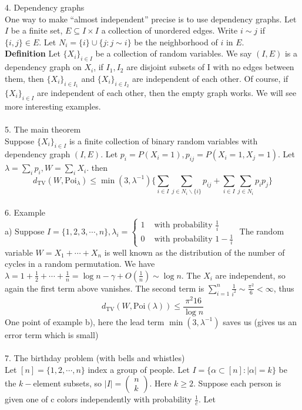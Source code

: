 \documentclass[12pt]{article}
\begin{document}
4. Dependency graphs\\
One way to make ``almost independent'' precise is to use dependency graphs. Let $I$ be a finite set, $E \subseteq I \times I$ a collection of unordered edges. Write $i \sim j$ if $\{i, j\}\in E$. Let $N_i = \{i\} \cup \{j: j\sim i\}$ be the neighborhood of $i$ in $E$.\\
\textbf{Definition} Let $\{X_i\}_{i \in I}$ be a collection of random variables. We say $(I, E)$ is a dependency graph on $X_i$, if $I_1, I_2$ are disjoint subsets of I with no edges between them, then $\{X_i\}_{i \in I_1}$ and $\{X_i\}_{i \in I_2}$ are independent of each other. Of course, if $\{X_i\}_{i \in I}$ are independent of each other, then the empty graph works. We will see more interesting examples.\\
\\
5. The main theorem\\
Suppose $\{X_i\}_{i \in I}$ is a finite collection of binary random variables with dependency graph $(I, E)$. Let $p_i = P(X_i = 1), p_{ij} = P(X_i = 1, X_j = 1)$. Let $\lambda = \sum_i p_i, W = \sum_i X_i$. then
$$d_{\text{TV}}(W, \text{Poi}_{\lambda}) \leqslant \min(3, \lambda^{-1})\{\sum_{i \in I}\sum_{j \in N_i\backslash \{i\}}p_{ij} + \sum_{i \in I}\sum_{j\in N_i}p_ip_j\}$$
\\
6. Example\\
a) Suppose $I = \{1, 2, 3, \cdots, n\}, \lambda_i = \begin{cases}
	1 & \text{ with probability }\frac{1}{i}\\
	0 & \text{ with probability }1 - \frac{1}{i}
\end{cases}$
The random variable $W = X_1 + \cdots + X_n$ is well known as the distribution of the number of cycles in a random permutation. We have $\lambda = 1 + \frac{1}{2} + \cdots + \frac{1}{n} = \log n - \gamma + O(\frac{1}{n}) \sim \log n$. The $X_i$ are independent, so again the first term above vanishes. The second term is $\sum_{i = 1}^n \frac{1}{i^2} \sim \frac{\pi^2}{6} < \infty$, thus
$$d_{\text{TV}}(W, \text{Poi}(\lambda)) \leqslant \frac{\pi^2 16}{\log n}$$
One point of example b), here the lead term $\min(3, \lambda^{-1})$ saves us (gives us an error term which is small)\\
\\
7. The birthday problem (with bells and whistles)\\
Let $[n] = \{1, 2, \cdots, n\}$ index a group of people. Let $I = \{\alpha \subset [n]: |\alpha| = k\}$ be the $k-$element subsets, so $|I| = \left(\begin{array}{c}
n\\
k
\end{array}\right)$. Here $k \geqslant 2$. Suppose each person is given one of c colors independently with probability $\frac{1}{c}$. Let
\end{document}
